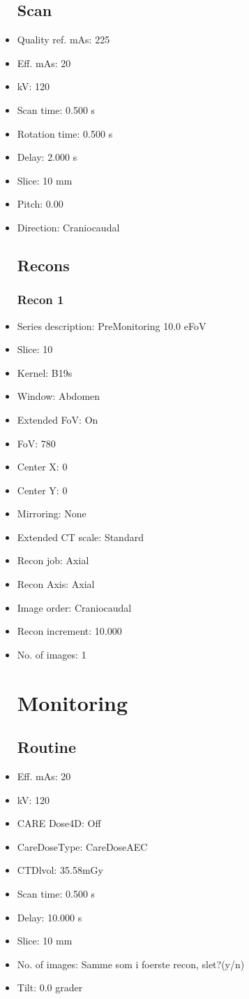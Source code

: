 \documentclass[12pt]{article}
\begin{document}
\begin{itemize}
\subsection{Scan}
\item Quality ref. mAs: 225\item Eff. mAs: 20\item kV: 120\item Scan time: 0.500 s\item Rotation time: 0.500 s\item Delay: 2.000 s\item Slice: 10 mm\item Pitch: 0.00\item Direction: Craniocaudal\subsection{Recons}

\subsubsection{Recon 1}
\item Series description: PreMonitoring 10.0 eFoV
\item Slice: 10
\item Kernel: B19s
\item Window: Abdomen
\item Extended FoV: On
\item FoV: 780
\item Center X: 0
\item Center Y: 0
\item Mirroring: None
\item Extended CT scale: Standard
\item Recon job: Axial
\item Recon Axis: Axial
\item Image order: Craniocaudal
\item Recon increment: 10.000
\item No. of images: 1
\section{Monitoring}
\subsection{Routine}
\item Eff. mAs: 20\item kV: 120\item CARE Dose4D: Off\item CareDoseType: CareDoseAEC\item CTDlvol: 35.58mGy\item Scan time: 0.500 s\item Delay: 10.000 s\item Slice: 10 mm\item No. of images: Samme som i foerste recon, slet?(y/n)\item Tilt: 0.0 grader

\end{itemize}
\end{document}
